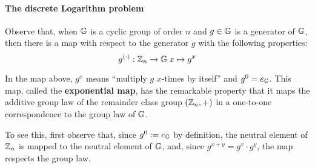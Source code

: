 \paragraph{The discrete Logarithm problem}
Observe that, when
$\mathbb{G}$ is a cyclic group of order $n$ and $g\in \mathbb{G}$ is a generator of $\mathbb{G}$, then there is a map with respect to the generator $g$ with the following properties:
\begin{equation}\label{exponentialmap}
g^{(\cdot)}: \mathbb{Z}_n \to \mathbb{G}\; x \mapsto g^x
\end{equation}

In the map above,  $g^x$ means ``multiply $g$ $x$-times by itself'' and $g^0=e_{\mathbb{G}}$. This map, called the \textbf{exponential map}, has the remarkable property that it maps the additive group law of the remainder class group $(\mathbb{Z}_n,+)$ in a one-to-one correspondence to the group law of $\mathbb{G}$.

To see this, first observe that, since $g^0:=e_{\mathbb{G}}$ by definition, the neutral element of $\mathbb{Z}_n$ is mapped to the neutral element of $\mathbb{G}$, and, since $g^{x+y}=g^x\cdot g^y$, the map respects the group law.

